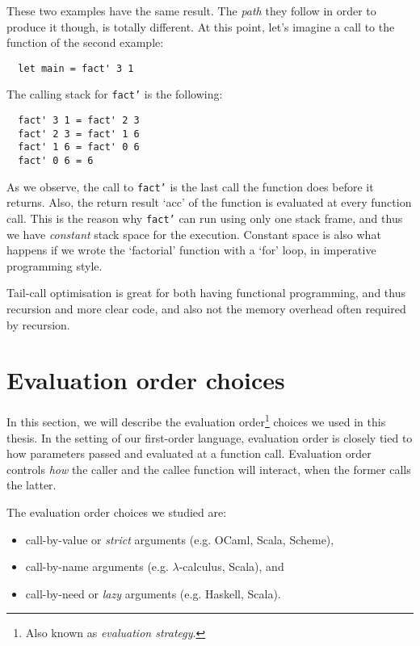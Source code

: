 \documentclass[diploma]{softlab-thesis}
\begin{document}
These two examples have the same result. The \textit{path} they follow in order to produce it though, is totally different.
At this point, let's imagine a call to the function of the second example:
\begin{verbatim}
  let main = fact' 3 1
\end{verbatim}
\noindent The calling stack for \texttt{fact'} is the following:
\begin{verbatim}
  fact' 3 1 = fact' 2 3
  fact' 2 3 = fact' 1 6
  fact' 1 6 = fact' 0 6
  fact' 0 6 = 6
\end{verbatim}

As we observe, the call to \texttt{fact'} is the last call the function does before it returns. Also, the return result `acc' of the function is 
evaluated at every function call. This is the reason why \texttt{fact'} can run using only one stack frame, and thus we have \textit{constant} stack 
space for the execution. Constant space is also what happens if we wrote the `factorial' function with a `for' loop, in imperative 
programming style. 

Tail-call optimisation is great for both having functional programming, and thus recursion and more clear code, and also not the 
memory overhead often required by recursion.

\section{Evaluation order choices}
\label{sec:evaluation-order}

In this section, we will describe the evaluation order\footnote{Also known as \emph{evaluation strategy}.} choices we used in this thesis. In the setting of our first-order language, evaluation order is closely tied to how parameters passed and evaluated at a function call. Evaluation order controls \textit{how} the caller and the callee function will interact, 
when the former calls the latter. 

The evaluation order choices we studied are: 
\begin{itemize}
  \item call-by-value or \textit{strict} arguments (e.g. OCaml, Scala, Scheme), 
  \item call-by-name arguments (e.g. $\lambda$-calculus, Scala), and
  \item call-by-need or \textit{lazy} arguments (e.g. Haskell, Scala).
\end{itemize}
\end{document}

